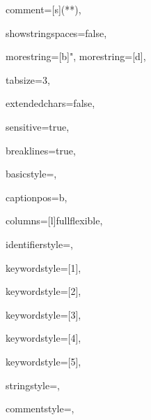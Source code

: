 {%

comment=[s]{(*}{*)},

showstringspaces=false,

morestring=[b]",
morestring=[d],

tabsize=3,							

extendedchars=false,

sensitive=true, 

breaklines=true,

basicstyle=\sffamily,

captionpos=b,							

columns=[l]fullflexible,

identifierstyle={\sffamily\color{black}},

keywordstyle=[1]{\sffamily\color{dkviolet}},

keywordstyle=[2]{\sffamily\color{dkgreen}},

keywordstyle=[3]{\sffamily\color{lightblue}},

keywordstyle=[4]{\sffamily\color{dkblue}},

keywordstyle=[5]{\sffamily\color{red}},



stringstyle=\sffamily,

commentstyle={\ttfamily\footnotesize},

}

